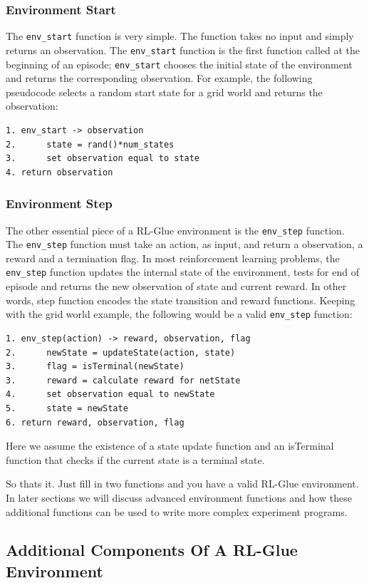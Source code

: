 \documentclass[11pt]{article}
\begin{document}
\subsubsection{Environment Start}
The \texttt{env\_start} function is very simple. The function takes no input and simply returns an observation. The \texttt{env\_start} function is the first function called at the beginning of an episode; \texttt{env\_start} chooses the initial state of the environment and returns the corresponding observation. For example, the following pseudocode selects a random start state for a grid world and returns the observation:
\begin{verbatim}
1. env_start -> observation
2.      state = rand()*num_states
3.      set observation equal to state
4. return observation
\end{verbatim}


\subsubsection{Environment Step}
The other essential piece of a RL-Glue environment is the \texttt{env\_step} function. The \texttt{env\_step} function must take an action, as input, and return a observation, a reward and a termination flag. In most reinforcement learning problems, the  \texttt{env\_step} function updates the internal state of the environment, tests for end of episode and returns the new observation of state and current reward. In other words, step function encodes the state transition and reward functions. Keeping with the grid world example, the following would be a valid \texttt{env\_step} function:
\begin{verbatim}
1. env_step(action) -> reward, observation, flag 
2.      newState = updateState(action, state)
3.      flag = isTerminal(newState)
3.      reward = calculate reward for netState
4.      set observation equal to newState
5.      state = newState
6. return reward, observation, flag
\end{verbatim}
Here we assume the existence of a state update function and an isTerminal function that checks if the current state is a terminal state.

So thats it. Just fill in two functions and you have a valid RL-Glue environment. In later sections we will discuss advanced environment functions and how these additional functions can be used to write more complex experiment programs. 

\subsection{Additional Components Of A RL-Glue Environment}
\label{envp2}
\end{document}
